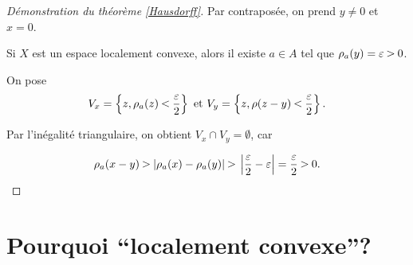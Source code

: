 \documentclass[french]{book}
\theoremstyle{definition}
\theoremstyle{remark}
\newcommand{\lesss}{\rotatebox[origin=c]{90}{$\land$}}
\newcommand{\less}{\ \lesss\ }
\newcommand{\biggg}{\rotatebox[origin=c]{90}{$\lor$}}
\newcommand{\bg}{\ \biggg\ }
\begin{document}
\begin{proof}[Démonstration du théorème \ref{Hausdorff}]
  Par contraposée, on prend $y \neq 0$ et $ x = 0$.

  Si $X$ est un espace localement convexe, alors il existe $a \in A$ tel que $\rho_a(y) = \varepsilon \bg 0$.

  On pose
  \begin{gather}
    V_x = \left\{ z, \rho_a(z) \less \frac{\varepsilon }{2} \right\} \text{ et } V_y = \left\{ z, \rho(z-y) \less \frac{\varepsilon }{2} \right\} .
  \end{gather}

  Par l'inégalité triangulaire, on obtient $V_x \cap V_y = \emptyset$, car

  \begin{gather*}
    \rho_a(x-y) \bg \lvert \rho_a(x) - \rho_a(y) \rvert \bg \left\lvert \frac{\varepsilon }{2} - \varepsilon  \right\rvert = \frac{\varepsilon }{2} \bg 0.
  \end{gather*}






\end{proof}

\section{Pourquoi ``localement convexe''?}
\end{document}
